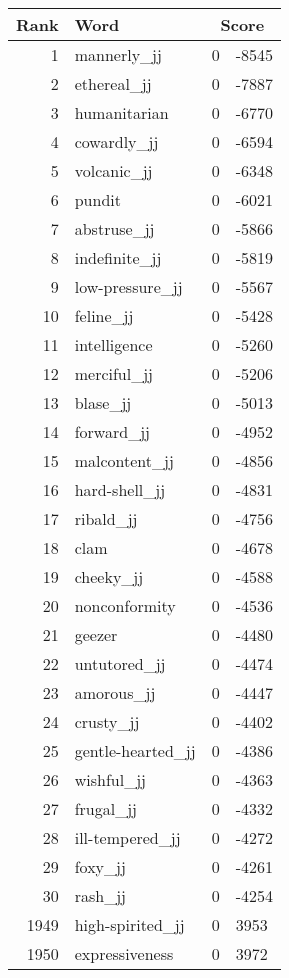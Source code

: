 \begin{longtable}[!htbp]{| rlr@{.}l |}
    \hline
    \textbf{Rank} & \textbf{Word} & \multicolumn{2}{c|}{\textbf{Score}} \\
    \hline
    \endhead
    1 & mannerly\_jj & 0 & -8545 \\
    2 & ethereal\_jj & 0 & -7887 \\
    3 & humanitarian & 0 & -6770 \\
    4 & cowardly\_jj & 0 & -6594 \\
    5 & volcanic\_jj & 0 & -6348 \\
    6 & pundit & 0 & -6021 \\
    7 & abstruse\_jj & 0 & -5866 \\
    8 & indefinite\_jj & 0 & -5819 \\
    9 & low-pressure\_jj & 0 & -5567 \\
    10 & feline\_jj & 0 & -5428 \\
    11 & intelligence & 0 & -5260 \\
    12 & merciful\_jj & 0 & -5206 \\
    13 & blase\_jj & 0 & -5013 \\
    14 & forward\_jj & 0 & -4952 \\
    15 & malcontent\_jj & 0 & -4856 \\
    16 & hard-shell\_jj & 0 & -4831 \\
    17 & ribald\_jj & 0 & -4756 \\
    18 & clam & 0 & -4678 \\
    19 & cheeky\_jj & 0 & -4588 \\
    20 & nonconformity & 0 & -4536 \\
    21 & geezer & 0 & -4480 \\
    22 & untutored\_jj & 0 & -4474 \\
    23 & amorous\_jj & 0 & -4447 \\
    24 & crusty\_jj & 0 & -4402 \\
    25 & gentle-hearted\_jj & 0 & -4386 \\
    26 & wishful\_jj & 0 & -4363 \\
    27 & frugal\_jj & 0 & -4332 \\
    28 & ill-tempered\_jj & 0 & -4272 \\
    29 & foxy\_jj & 0 & -4261 \\
    30 & rash\_jj & 0 & -4254 \\
    1949 & high-spirited\_jj & 0 & 3953 \\
    1950 & expressiveness & 0 & 3972 \\

\end{longtable}

